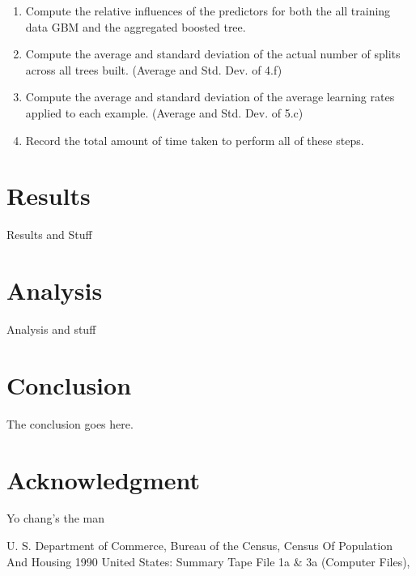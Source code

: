 \documentclass[9pt, conference]{IEEEtran}
\begin{document}
\begin{enumerate}
	\item Compute the relative influences of the predictors for both the all training data GBM and the aggregated boosted tree.
	\item Compute the average and standard deviation of the actual number of splits across all trees built. (Average and Std. Dev. of 4.f)
	\item Compute the average and standard deviation of the average learning rates applied to each example. (Average and Std. Dev. of 5.c)
	\item Record the total amount of time taken to perform all of these steps.
\end{enumerate}
\section{Results}
Results and Stuff
\section{Analysis}
Analysis and stuff
\section{Conclusion}
The conclusion goes here.






\section*{Acknowledgment}
Yo chang's the man






U. S. Department of Commerce, Bureau of the Census, Census Of Population And Housing 1990 United States: Summary Tape File 1a \& 3a (Computer Files),
\end{document}
